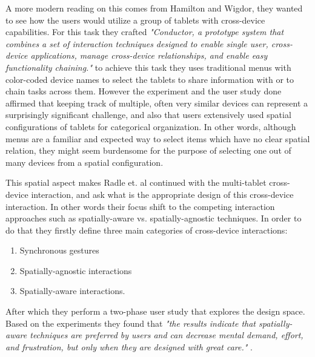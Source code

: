 A more modern reading on this comes from Hamilton and Wigdor, they wanted to see how the users would utilize a group of tablets with cross-device capabilities. For this task they crafted\emph{ "Conductor, a prototype system that combines a set of interaction techniques designed to enable single user, cross-device applications, manage cross-device relationships, and enable easy functionality chaining."} \cite{Hamilton:2014} to achieve this task they uses traditional menus with color-coded device names to select the tablets to share information with or to chain tasks across them. However the experiment and the user study done affirmed that keeping track of multiple, often very similar devices can represent a surprisingly significant challenge, and also that users extensively used spatial configurations of tablets for categorical organization. In other words, although menus are a familiar and expected way to select items which have no clear spatial relation, they might seem burdensome for the purpose of selecting one out of many devices from a spatial configuration.  

This spatial aspect makes Radle et. al continued with the multi-tablet cross-device interaction, and ask what is the appropriate design of this cross-device interaction. In other words their focus shift to the competing interaction approaches such as spatially-aware vs. spatially-agnostic techniques. In order to do that they firstly define three main categories of cross-device interactions: \begin{enumerate}
	\item Synchronous gestures
	\item Spatially-agnostic interactions
	\item Spatially-aware interactions. 
\end{enumerate} After which they perform a two-phase user study that explores the design space. Based on the experiments they found that \emph{"the results indicate that spatially-aware techniques are preferred by users and can decrease mental demand, effort, and frustration, but only when they are designed with great care."} \cite{Radle:2015}.

